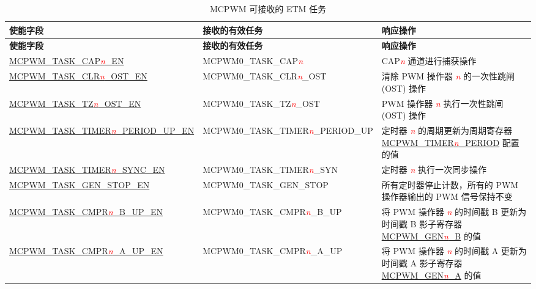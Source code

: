 \begin{longtable}{ | l | l | L{5cm} |}
    \caption{MCPWM 可接收的 ETM 任务}
    \label{tab:mcpwm-etm-task}
    \\\hline
   \textbf{使能字段} & \textbf{接收的有效任务} & \textbf{响应操作} \\\hline
    \endfirsthead
    \hline
    \textbf{使能字段} & \textbf{接收的有效任务} & \textbf{响应操作}  \\\hline
    \endhead
    \hline
    \endfoot
    
    \hyperref[fielddesc:MCPWMTASKCAP0EN]{MCPWM\_TASK\_CAP\textcolor{red}{\it{n}}\_EN}
    &  MCPWM0\_TASK\_CAP\textcolor{red}{\it{n}}
    &  CAP\textcolor{red}{\it{n}} 通道进行捕获操作 \\\hline
    \hyperref[fielddesc:MCPWMTASKCLR0OSTEN]{MCPWM\_TASK\_CLR\textcolor{red}{\it{n}}\_OST\_EN}
    &  MCPWM0\_TASK\_CLR\textcolor{red}{\it{n}}\_OST
    &  清除 PWM 操作器 \textcolor{red}{\it{n}} 的一次性跳闸 (OST) 操作 \\\hline
    \hyperref[fielddesc:MCPWMTASKTZ0OSTEN]{MCPWM\_TASK\_TZ\textcolor{red}{\it{n}}\_OST\_EN}
    &  MCPWM0\_TASK\_TZ\textcolor{red}{\it{n}}\_OST
    &  PWM 操作器 \textcolor{red}{\it{n}} 执行一次性跳闸 (OST) 操作 \\\hline
    \hyperref[fielddesc:MCPWMTASKTIMER0PERIODUPEN]{MCPWM\_TASK\_TIMER\textcolor{red}{\it{n}}\_PERIOD\_UP\_EN}
    &  MCPWM0\_TASK\_TIMER\textcolor{red}{\it{n}}\_PERIOD\_UP
    &  定时器 \textcolor{red}{\it{n}} 的周期更新为周期寄存器 \hyperref[fielddesc:MCPWMTIMERNPERIOD]{MCPWM\_TIMER\textcolor{red}{\it{n}}\_PERIOD} 配置的值 \\\hline
    \hyperref[fielddesc:MCPWMTASKTIMER0SYNCEN]{MCPWM\_TASK\_TIMER\textcolor{red}{\it{n}}\_SYNC\_EN}
    &  MCPWM0\_TASK\_TIMER\textcolor{red}{\it{n}}\_SYN
    &  定时器 \textcolor{red}{\it{n}} 执行一次同步操作 \\\hline
    \hyperref[fielddesc:MCPWMTASKGENSTOPEN]{MCPWM\_TASK\_GEN\_STOP\_EN}
    &  MCPWM0\_TASK\_GEN\_STOP
    &  所有定时器停止计数，所有的 PWM 操作器输出的 PWM 信号保持不变 \\\hline
    \hyperref[fielddesc:MCPWMTASKCMPR0BUPEN]{MCPWM\_TASK\_CMPR\textcolor{red}{\it{n}}\_B\_UP\_EN}
    &  MCPWM0\_TASK\_CMPR\textcolor{red}{\it{n}}\_B\_UP
    &  将 PWM 操作器 \textcolor{red}{\it{n}} 的时间戳 B 更新为时间戳 B 影子寄存器 \hyperref[regdesc:MCPWMGENNBREG]{MCPWM\_GEN\textcolor{red}{\it{n}}\_B} 的值 \\\hline
    \hyperref[fielddesc:MCPWMTASKCMPR0AUPEN]{MCPWM\_TASK\_CMPR\textcolor{red}{\it{n}}\_A\_UP\_EN}
    &  MCPWM0\_TASK\_CMPR\textcolor{red}{\it{n}}\_A\_UP
    &  将 PWM 操作器 \textcolor{red}{\it{n}} 的时间戳 A 更新为时间戳 A 影子寄存器 \hyperref[regdesc:MCPWMGENNAREG]{MCPWM\_GEN\textcolor{red}{\it{n}}\_A} 的值 \\\hline
\end{longtable}